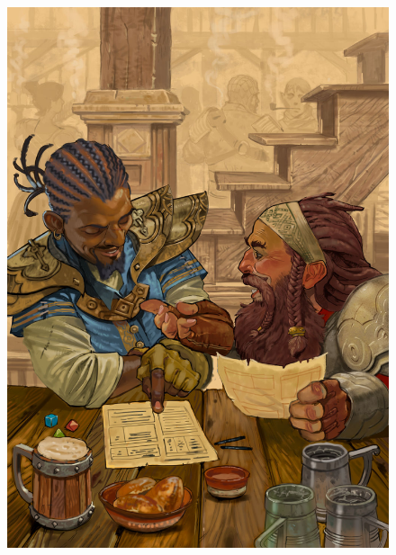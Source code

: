 \begin{figure}%
\begin{center}
\includegraphics[scale=0.2]{img/character_creation_by_ncorva.jpg}
\end{center}
\end{figure}




